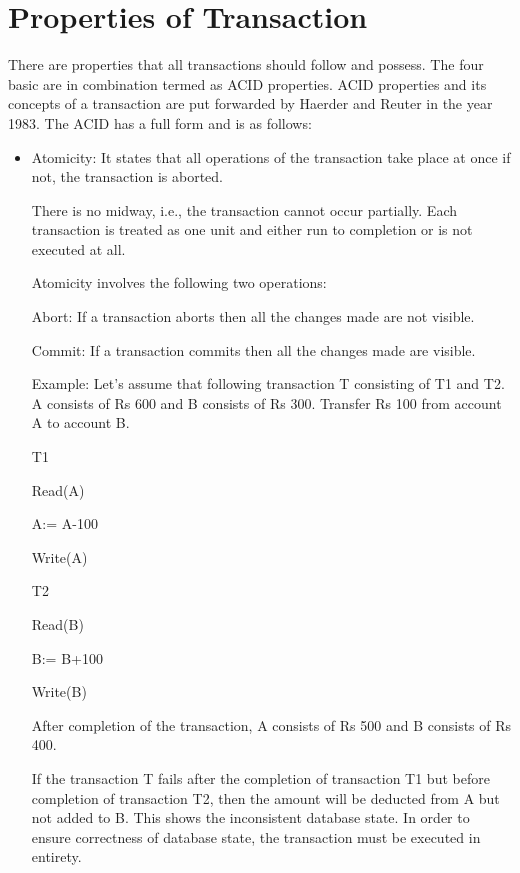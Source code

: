 \documentclass{article}
\begin{document}
\section{Properties of Transaction}

There are properties that all transactions should follow and possess. The four basic are in combination termed as ACID properties. ACID properties and its concepts of a transaction are put forwarded by Haerder and Reuter in the year 1983. The ACID has a full form and is as follows:

\begin{itemize}

\item Atomicity: It states that all operations of the transaction take place at once if not, the transaction is aborted.

There is no midway, i.e., the transaction cannot occur partially. Each transaction is treated as one unit and either run to completion or is not executed at all.

Atomicity involves the following two operations:

Abort: If a transaction aborts then all the changes made are not visible.

Commit: If a transaction commits then all the changes made are visible.

Example: Let's assume that following transaction T consisting of T1 and T2. A consists of Rs 600 and B consists of Rs 300. Transfer Rs 100 from account A to account B.
\begin{center}
T1	

Read(A)

A:= A-100

Write(A)	
\end{center}

\begin{center}


T2

Read(B)

B:= B+100

Write(B)

\end{center}
After completion of the transaction, A consists of Rs 500 and B consists of Rs 400.

If the transaction T fails after the completion of transaction T1 but before completion of transaction T2, then the amount will be deducted from A but not added to B. This shows the inconsistent database state. In order to ensure correctness of database state, the transaction must be executed in entirety.


\end{itemize}
\end{document}
